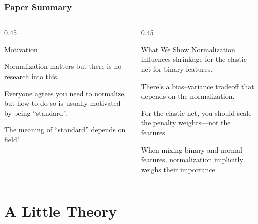\documentclass[onlytextwidth,aspectratio=1610]{beamer}
\begin{document}
\begin{frame}[c]
  \frametitle{Paper Summary}

  \begin{columns}[T]
    \begin{column}{0.45\textwidth}
      \begin{block}{Motivation}

        Normalization matters but there is no research into this.

        \medskip\pause

        Everyone agrees you need to normalize, but how to do so is usually motivated by being
        ``standard''.

        \medskip\pause

        The meaning of ``standard'' depends on field!
      \end{block}
    \end{column}

    \pause

    \begin{column}{0.45\textwidth}

      \begin{block}{What We Show}
        Normalization influences shrinkage for the elastic net
        for binary features.

        \medskip\pause

        There's a bias--variance tradeoff that depends on the normalization.

        \medskip\pause

        For the elastic net, you should scale the penalty weights---not the features.

        \medskip\pause

        When mixing binary and normal features, normalization implicitly weighs their importance.
      \end{block}

    \end{column}
  \end{columns}

\end{frame}

\section{A Little Theory}
\end{document}

